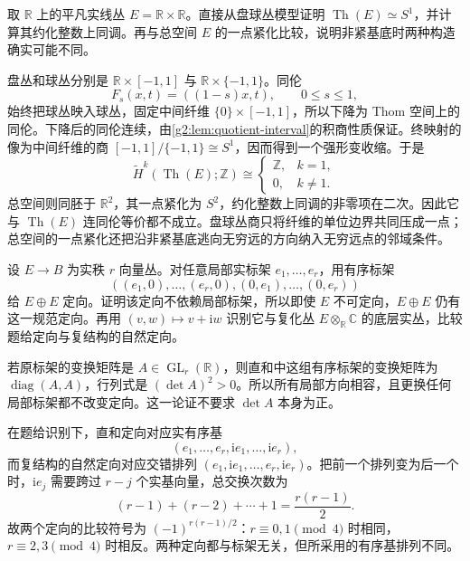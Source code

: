 \BookExercises

\begin{exercise}\label{g2:ex:noncompact-thom-not-compactification}
	取 \(\mathbb R\) 上的平凡实线丛 \(E=\mathbb R\times\mathbb R\)。直接从盘球丛模型证明 \(\operatorname{Th}(E)\simeq S^1\)，并计算其约化整数上同调。再与总空间 \(E\) 的一点紧化比较，说明非紧基底时两种构造确实可能不同。
\end{exercise}
\begin{solution}
	盘丛和球丛分别是 \(\mathbb R\times[-1,1]\) 与 \(\mathbb R\times\{-1,1\}\)。同伦
	\[
		F_s(x,t)=((1-s)x,t),\qquad 0\le s\le1,
	\]
	始终把球丛映入球丛，固定中间纤维 \(\{0\}\times[-1,1]\)，所以下降为 Thom 空间上的同伦。下降后的同伦连续，由\cref{g2:lem:quotient-interval}的积商性质保证。终映射的像为中间纤维的商 \([-1,1]/\{-1,1\}\cong S^1\)，因而得到一个强形变收缩。于是
	\[
		\widetilde H^k(\operatorname{Th}(E);\mathbb Z)\cong
		\begin{cases}
			\mathbb Z,&k=1,\\
			0,&k\ne1.
		\end{cases}
	\]
	总空间则同胚于 \(\mathbb R^2\)，其一点紧化为 \(S^2\)，约化整数上同调的非零项在二次。因此它与 \(\operatorname{Th}(E)\) 连同伦等价都不成立。盘球丛商只将纤维的单位边界共同压成一点；总空间的一点紧化还把沿非紧基底逃向无穷远的方向纳入无穷远点的邻域条件。
\end{solution}

\begin{exercise}\label{g2:ex:doubled-bundle-orientation}
	设 \(E\to B\) 为实秩 \(r\) 向量丛。对任意局部实标架 \(e_1,\ldots,e_r\)，用有序标架
	\[
		((e_1,0),\ldots,(e_r,0),(0,e_1),\ldots,(0,e_r))
	\]
	给 \(E\oplus E\) 定向。证明该定向不依赖局部标架，所以即使 \(E\) 不可定向，\(E\oplus E\) 仍有这一规范定向。再用 \((v,w)\mapsto v+\mathrm i w\) 识别它与复化丛 \(E\otimes_{\mathbb R}\mathbb C\) 的底层实丛，比较题给定向与复结构的自然定向。
\end{exercise}
\begin{solution}
	若原标架的变换矩阵是 \(A\in\operatorname{GL}_r(\mathbb R)\)，则直和中这组有序标架的变换矩阵为 \(\operatorname{diag}(A,A)\)，行列式是 \((\det A)^2>0\)。所以所有局部方向相容，且更换任何局部标架都不改变定向。这一论证不要求 \(\det A\) 本身为正。

	在题给识别下，直和定向对应实有序基
	\[
		(e_1,\ldots,e_r,\mathrm i e_1,\ldots,\mathrm i e_r),
	\]
	而复结构的自然定向对应交错排列 \((e_1,\mathrm i e_1,\ldots,e_r,\mathrm i e_r)\)。把前一个排列变为后一个时，\(\mathrm i e_j\) 需要跨过 \(r-j\) 个实基向量，总交换次数为
	\[
		(r-1)+(r-2)+\cdots+1=\frac{r(r-1)}2.
	\]
	故两个定向的比较符号为 \((-1)^{r(r-1)/2}\)：\(r\equiv0,1\pmod4\) 时相同，\(r\equiv2,3\pmod4\) 时相反。两种定向都与标架无关，但所采用的有序基排列不同。
\end{solution}

